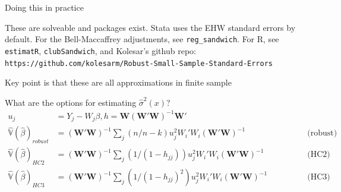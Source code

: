 \documentclass[notes,11pt, aspectratio=169]{beamer}
\newenvironment{wideitemize}{\itemize\addtolength{\itemsep}{10pt}}{\enditemize}
\begin{document}
\begin{frame}{Doing this in practice}
  \begin{wideitemize}
  \item These are solveable and packages exist. Stata uses the EHW 
    standard errors by default. For the Bell-Maccaffrey adjustments,
    see \texttt{reg\_sandwich}. For R, see \texttt{estimatR},
    \texttt{clubSandwich}, and Kolesar's github repo:
    \texttt{https://github.com/kolesarm/Robust-Small-Sample-Standard-Errors}
  \item Key point is that these are all approximations in finite sample
  \item What are the options for estimating $\hat{\sigma}^{2}(x)$?  
    \begin{align*}
      u_{j} &= Y_{j} - W_{j}\beta, h = \mathbf{W}(\mathbf{W}'\mathbf{W})^{-1}\mathbf{W}' & \\
          \hat{\mathbb{V}}(\hat{\beta})_{robust} &= (\mathbf{W}'\mathbf{W})^{-1}\sum_{j}(n/n-k) u_{j}^{2}W_{i}'W_{i}(\mathbf{W}'\mathbf{W})^{-1} \qquad \qquad&  \text{(robust)}\\
       \hat{\mathbb{V}}(\hat{\beta})_{HC2} &= (\mathbf{W}'\mathbf{W})^{-1}\sum_{j} (1/(1-h_{jj}))u_{j}^{2}W_{i}'W_{i}(\mathbf{W}'\mathbf{W})^{-1} \qquad \qquad& \text{(HC2)}\\
       \hat{\mathbb{V}}(\hat{\beta})_{HC3} &= (\mathbf{W}'\mathbf{W})^{-1}\sum_{j} (1/(1-h_{jj})^{2})u_{j}^{2}W_{i}'W_{i}(\mathbf{W}'\mathbf{W})^{-1} \qquad \qquad& \text{(HC3)}\\
    \end{align*}
    
  \end{wideitemize}
\end{frame}
\end{document}

